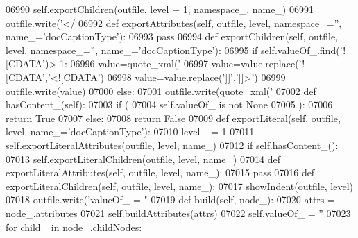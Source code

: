 \begin{DoxyCode}
{{{{{{{{{{{{{{{{{{{{{{{{{{{{{{{{{{{{{{{{{{{{{{{{{{{{{{{{{{{{{{{{{{{{{{{{{{{{{{{{{{{{{{{{{{{{{{{{{{{{{{{{{{{{{{{{{{{{{{{{{{{{{{{{{{{{{{{{{{{{{{{{{{{{{{{{{{{{{{{{{{{{{{{{{{{{{{{{{{{{{{{{{{{{{{{{{{{{{{{{{{{{{{{{{{{{{{{{{{{{{{{{{{{{{{{{{{{{{{{{{{{{{{{{{{{{{{{{{{{{{{{{{{{{{{{{{{{{{{{{{{{{{{{{{{{{{{{{{{{{{{{{{{{{{{{{{{{{{{{{{{{{{{{{{{{{{{{{{{{{{{{{{{{{{{{{{{{{{{{{{{{{{{{{{{{{{{{{{{{{{{{{{{{{{{{{{{{{{{{{{{{{{{{{{{{{{{{{{{{{{{{{{{{{{06990         self.exportChildren(outfile, level + 1, namespace\_, name\_)
06991         outfile.write(\textcolor{stringliteral}{'</%
06992     \textcolor{keyword}{def }exportAttributes(self, outfile, level, namespace\_='', name\_='docCaptionType'):
06993         \textcolor{keywordflow}{pass}
06994     \textcolor{keyword}{def }exportChildren(self, outfile, level, namespace\_='', name\_='docCaptionType'):
06995         \textcolor{keywordflow}{if} self.valueOf\_.find(\textcolor{stringliteral}{'![CDATA'})>-1:
06996             value=quote_xml(\textcolor{stringliteral}{'%
06997             value=value.replace(\textcolor{stringliteral}{'![CDATA'},\textcolor{stringliteral}{'<![CDATA'})
06998             value=value.replace(\textcolor{stringliteral}{']]'},\textcolor{stringliteral}{']]>'})
06999             outfile.write(value)
07000         \textcolor{keywordflow}{else}:
07001             outfile.write(quote_xml(\textcolor{stringliteral}{'%
07002     \textcolor{keyword}{def }hasContent_(self):
07003         \textcolor{keywordflow}{if} (
07004             self.valueOf_ \textcolor{keywordflow}{is} \textcolor{keywordflow}{not} \textcolor{keywordtype}{None}
07005             ):
07006             \textcolor{keywordflow}{return} \textcolor{keyword}{True}
07007         \textcolor{keywordflow}{else}:
07008             \textcolor{keywordflow}{return} \textcolor{keyword}{False}
07009     \textcolor{keyword}{def }exportLiteral(self, outfile, level, name\_='docCaptionType'):
07010         level += 1
07011         self.exportLiteralAttributes(outfile, level, name\_)
07012         \textcolor{keywordflow}{if} self.hasContent_():
07013             self.exportLiteralChildren(outfile, level, name\_)
07014     \textcolor{keyword}{def }exportLiteralAttributes(self, outfile, level, name\_):
07015         \textcolor{keywordflow}{pass}
07016     \textcolor{keyword}{def }exportLiteralChildren(self, outfile, level, name\_):
07017         showIndent(outfile, level)
07018         outfile.write(\textcolor{stringliteral}{'valueOf\_ = "%
07019     \textcolor{keyword}{def }build(self, node\_):
07020         attrs = node\_.attributes
07021         self.buildAttributes(attrs)
07022         self.valueOf_ = \textcolor{stringliteral}{''}
07023         \textcolor{keywordflow}{for} child\_ \textcolor{keywordflow}{in} node\_.childNodes:
}}}}}}}}}}}}}}}}}}}}}}}}}}}}}}}}}}}}}}}}}}}}}}}}}}}}}}}}}}}}}}}}}}}}}}}}}}}}}}}}}}}}}}}}}}}}}}}}}}}}}}}}}}}}}}}}}}}}}}}}}}}}}}}}}}}}}}}}}}}}}}}}}}}}}}}}}}}}}}}}}}}}}}}}}}}}}}}}}}}}}}}}}}}}}}}}}}}}}}}}}}}}}}}}}}}}}}}}}}}}}}}}}}}}}}}}}}}}}}}}}}}}}}}}}}}}}}}}}}}}}}}}}}}}}}}}}}}}}}}}}}}}}}}}}}}}}}}}}}}}}}}}}}}}}}}}}}}}}}}}}}}}}}}}}}}}}}}}}}}}}}}}}}}}}}}}}}}}}}}}}}}}}}}}}}}}}}}}}}}}}}}}}}}}}}}}}}}}}}}}}}}}}}}}}}}}}}}}}}}}}}}}}}}}}}}}}
\end{DoxyCode}
